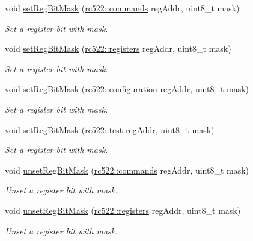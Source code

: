 \begin{DoxyCompactItemize}
void \hyperlink{classrc522_a2a6643f07cb56370ce58605b4aa4bde1}{set\+Reg\+Bit\+Mask} (\hyperlink{classrc522_a6df2359c88d6c2f47faf58bc9e09eaa4}{rc522\+::commands} reg\+Addr, uint8\+\_\+t mask)
\begin{DoxyCompactList}\small\item\em Set a register bit with mask. \end{DoxyCompactList}\item 
void \hyperlink{classrc522_acadff61e3733655710ea945c03137a39}{set\+Reg\+Bit\+Mask} (\hyperlink{classrc522_a83057db5f8fefa3dc9a6e8e5f0e191ee}{rc522\+::registers} reg\+Addr, uint8\+\_\+t mask)
\begin{DoxyCompactList}\small\item\em Set a register bit with mask. \end{DoxyCompactList}\item 
void \hyperlink{classrc522_aae350dcb495ec47cbb081b2fd9df35ff}{set\+Reg\+Bit\+Mask} (\hyperlink{classrc522_afcf27c8198d017cd4e8173c7d7a6fded}{rc522\+::configuration} reg\+Addr, uint8\+\_\+t mask)
\begin{DoxyCompactList}\small\item\em Set a register bit with mask. \end{DoxyCompactList}\item 
void \hyperlink{classrc522_ac3752c747cd1cbb4510eaf24d363befe}{set\+Reg\+Bit\+Mask} (\hyperlink{classrc522_a9589917c9bbcd18ea9c7d86c7ec565bd}{rc522\+::test} reg\+Addr, uint8\+\_\+t mask)
\begin{DoxyCompactList}\small\item\em Set a register bit with mask. \end{DoxyCompactList}\item 
void \hyperlink{classrc522_a18c7a632fbb1206326008025c522ef20}{unset\+Reg\+Bit\+Mask} (\hyperlink{classrc522_a6df2359c88d6c2f47faf58bc9e09eaa4}{rc522\+::commands} reg\+Addr, uint8\+\_\+t mask)
\begin{DoxyCompactList}\small\item\em Unset a register bit with mask. \end{DoxyCompactList}\item 
void \hyperlink{classrc522_ad5a055b560cb7e84801497a6acad1e70}{unset\+Reg\+Bit\+Mask} (\hyperlink{classrc522_a83057db5f8fefa3dc9a6e8e5f0e191ee}{rc522\+::registers} reg\+Addr, uint8\+\_\+t mask)
\begin{DoxyCompactList}\small\item\em Unset a register bit with mask. \end{DoxyCompactList}\item 

\end{DoxyCompactItemize}
